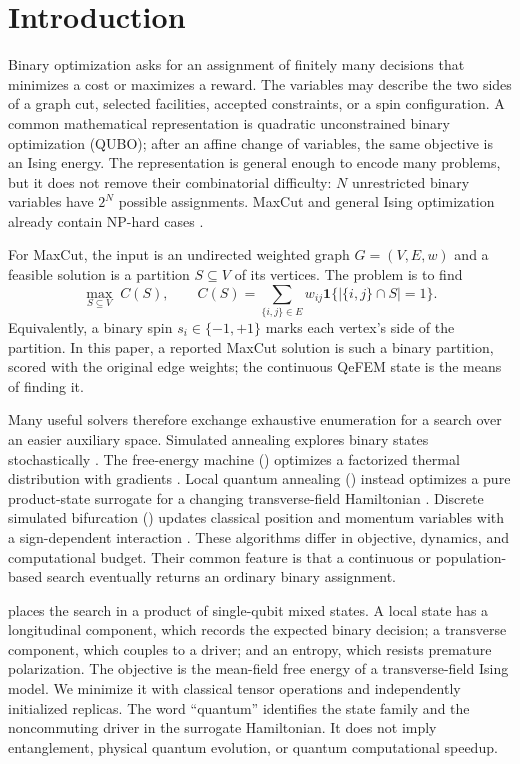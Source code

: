 \section{Introduction}
\label{sec:introduction}

Binary optimization asks for an assignment of finitely many decisions that
minimizes a cost or maximizes a reward. The variables may describe the two
sides of a graph cut, selected facilities, accepted constraints, or a spin
configuration. A common mathematical representation is quadratic
unconstrained binary optimization (QUBO); after an affine change of
variables, the same objective is an Ising energy. The representation is
general enough to encode many problems, but it does not remove their
combinatorial difficulty: $N$ unrestricted binary variables have $2^N$
possible assignments. MaxCut and general Ising optimization already contain
NP-hard cases \citep{karp1972,barahona1982,lucas2014}.

For MaxCut, the input is an undirected weighted graph $G=(V,E,w)$ and a
feasible solution is a partition $S\subseteq V$ of its vertices. The problem
is to find
\begin{equation}
 \max_{S\subseteq V}\; C(S),\qquad
 C(S)=\sum_{\{i,j\}\in E}w_{ij}
 \mathbf 1\{ |\{i,j\}\cap S|=1\}.
 \label{eq:maxcut-statement}
\end{equation}
Equivalently, a binary spin $s_i\in\{-1,+1\}$ marks each vertex's side of
the partition. In this paper, a reported MaxCut solution is such a binary
partition, scored with the original edge weights; the continuous QeFEM
state is the means of finding it.

Many useful solvers therefore exchange exhaustive enumeration for a search
over an easier auxiliary space. Simulated annealing explores binary states
stochastically \citep{kirkpatrick1983}. The free-energy machine (\FEM)
optimizes a factorized thermal distribution with gradients
\citep{shen2025}. Local quantum annealing (\LQA) instead optimizes a pure
product-state surrogate for a changing transverse-field Hamiltonian
\citep{bowles2022}. Discrete simulated bifurcation (\dSB) updates classical
position and momentum variables with a sign-dependent interaction
\citep{goto2021dsbm}. These algorithms differ in objective, dynamics, and
computational budget. Their common feature is that a continuous or
population-based search eventually returns an ordinary binary assignment.

\QeFEM{} places the search in a product of single-qubit mixed states. A
local state has a longitudinal component, which records the expected binary
decision; a transverse component, which couples to a driver; and an entropy,
which resists premature polarization. The objective is the mean-field free
energy of a transverse-field Ising model. We minimize it with classical
tensor operations and independently initialized replicas. The word
``quantum'' identifies the state family and the noncommuting driver in the
surrogate Hamiltonian. It does not imply entanglement, physical quantum
evolution, or quantum computational speedup.

